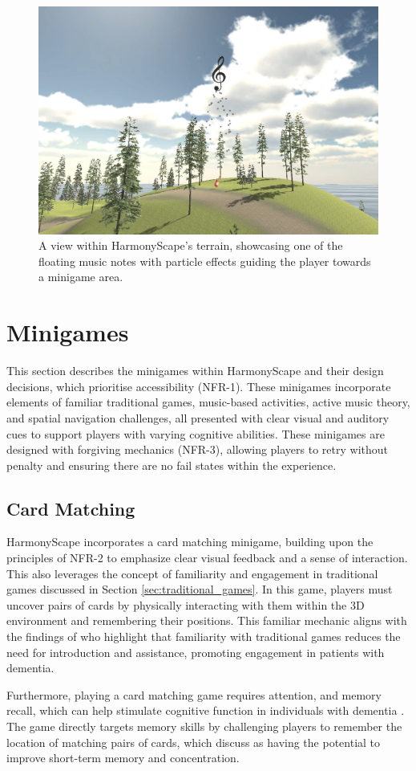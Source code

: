 \documentclass{l4proj}
\begin{document}
\begin{figure}[h]
    \centering
    \includegraphics[width=0.5\linewidth]{dissertation/images/floating_notes.png} 
    \caption{A view within HarmonyScape's terrain, showcasing one of the floating music notes with particle effects guiding the player towards a minigame area. }
    \label{fig:floating_notes} 
\end{figure}

\section{Minigames}
This section describes the minigames within HarmonyScape and their design decisions, which prioritise accessibility (NFR-1). These minigames incorporate elements of familiar traditional games, music-based activities, active music theory, and spatial navigation challenges, all presented with clear visual and auditory cues to support players with varying cognitive abilities. These minigames are designed with forgiving mechanics (NFR-3), allowing players to retry without penalty and ensuring there are no fail states within the experience.

\subsection{Card Matching}
HarmonyScape incorporates a card matching minigame, building upon the principles of NFR-2 to emphasize clear visual feedback and a sense of interaction. This also leverages the concept of familiarity and engagement in traditional games discussed in Section \ref{sec:traditional_games}. In this game, players must uncover pairs of cards by physically interacting with them within the 3D environment and remembering their positions. This familiar mechanic aligns with the findings of \cite{de_siqueira_review_2017} who highlight that familiarity with traditional games reduces the need for introduction and assistance, promoting engagement in patients with dementia.

Furthermore, playing a card matching game requires attention, and memory recall, which can help stimulate cognitive function in individuals with dementia \citep{eichhorn_innovative_2018}. The game directly targets memory skills by challenging players to remember the location of matching pairs of cards, which \cite{eichhorn_innovative_2018} discuss as having the potential to improve short-term memory and concentration.
\end{document}
